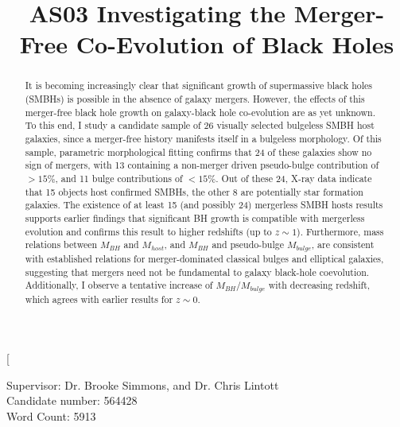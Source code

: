 \documentclass[11pt,twocolumn]{article}
\begin{document}
\title{AS03 Investigating the Merger-Free Co-Evolution of Black Holes}

\date{}

\twocolumn[
  \begin{@twocolumnfalse}
\vspace{-3em}

Supervisor: Dr. Brooke Simmons, and Dr. Chris Lintott\\
Candidate number: 564428\\
Word Count: 5913\\
    \maketitle

\vspace{-5em}

\renewcommand{\abstractname}{\normalsize Abstract}
    \begin{abstract}
\normalsize
\noindent
 It is becoming increasingly clear that significant growth of supermassive black holes (SMBHs) is possible in the absence of galaxy mergers. However, the effects of this merger-free black hole growth on galaxy-black hole co-evolution are as yet unknown. To this end, I study a candidate sample of 26 visually selected bulgeless SMBH host galaxies, since a merger-free history manifests itself in a bulgeless morphology. Of this sample, parametric morphological fitting confirms that 24 of these galaxies show no sign of mergers, with 13 containing a non-merger driven pseudo-bulge contribution of  $>15 \%$, and 11 bulge contributions of $<15\%$. Out of these 24, X-ray data indicate that 15 objects host confirmed SMBHs, the other 8 are potentially star formation galaxies.  The existence of at least 15 (and possibly 24) mergerless SMBH hosts results supports earlier findings that significant BH growth is compatible with mergerless evolution and confirms this result to higher redshifts (up to $ z\sim1$). Furthermore, mass relations between $M_{BH}$ and $M_{host}$, and $M_{BH}$ and pseudo-bulge $M_{bulge}$, are consistent with established relations for merger-dominated classical bulges and elliptical galaxies, suggesting that mergers need not be fundamental to galaxy black-hole coevolution. Additionally, I observe a tentative increase of $M_{BH}/M_{bulge}$ with decreasing redshift, which agrees with earlier results for $z\sim 0$. 


\end{abstract}
\end{@twocolumnfalse}
\end{document}
